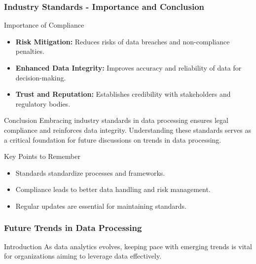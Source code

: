 \documentclass[aspectratio=169]{beamer}
\begin{document}
\begin{frame}[fragile]
    \frametitle{Industry Standards - Importance and Conclusion}
    \begin{block}{Importance of Compliance}
        \begin{itemize}
            \item \textbf{Risk Mitigation:} Reduces risks of data breaches and non-compliance penalties.
            \item \textbf{Enhanced Data Integrity:} Improves accuracy and reliability of data for decision-making.
            \item \textbf{Trust and Reputation:} Establishes credibility with stakeholders and regulatory bodies.
        \end{itemize}
    \end{block}

    \begin{block}{Conclusion}
        Embracing industry standards in data processing ensures legal compliance and reinforces data integrity. Understanding these standards serves as a critical foundation for future discussions on trends in data processing.
    \end{block}

    \begin{block}{Key Points to Remember}
        \begin{itemize}
            \item Standards standardize processes and frameworks.
            \item Compliance leads to better data handling and risk management.
            \item Regular updates are essential for maintaining standards.
        \end{itemize}
    \end{block}
\end{frame}

\begin{frame}[fragile]
    \frametitle{Future Trends in Data Processing}
    \begin{block}{Introduction}
        As data analytics evolves, keeping pace with emerging trends is vital for organizations aiming to leverage data effectively.
    \end{block}
\end{frame}
\end{document}
